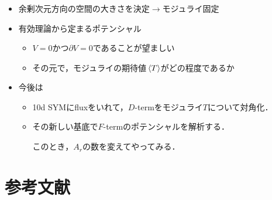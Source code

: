\documentclass[
  a4paper,uplatex,dvipdfmx,10pt,
  xcolor = {dvipsnames,svgnames},
  hyperref ={colorlinks=true,citecolor=Navy,linkcolor=NavyBlue,urlcolor=purple}
]{beamer}
\renewcommand{\theequation}{\thesection.\arabic{equation}}
\begin{document}
\begin{frame}
  \frametitle{\secname}
  \color{DarkMagenta}

  \begin{itemize}
    \color{DarkMagenta}
    \item 
    余剰次元方向の空間の大きさを決定$\rightarrow$モジュライ固定

    \item 
    有効理論から定まるポテンシャル
    \begin{itemize}
      \color{DarkMagenta}
      \item 
      $V=0$かつ$\partial V=0$であることが望ましい
      \item 
      その元で，モジュライの期待値$\ev*{T}$がどの程度であるか
    \end{itemize}

    \color{black}
    \item 
    今後は
    \begin{itemize}
      \item 
      10d SYMにfluxをいれて，$D$-termをモジュライ$T$について対角化．
      \item 
      その新しい基底で$F$-termのポテンシャルを解析する．

      このとき，$A_{r}$の数を変えてやってみる．
    \end{itemize}

  \end{itemize}

\end{frame}


\section{参考文献}
\begin{frame}[allowframebreaks]
  \frametitle{\secname}
  \scriptsize
  \beamertemplatetextbibitems
  
  
  \nocite{Cremades_ComputingYukawa_2004a}
  \nocite{Polonyi_GeneralizationMassive_1977}
  \nocite{Intriligator_DynamicalSUSY_2006a}
  \nocite{Kaku_SuperconformalUnified_1977}
  \nocite{Wess_SupersymmetrySupergravity_1992}
  \nocite{柴崎_背景_2021}
  \nocite{中野_磁化_2023}
\end{frame}


\setcounter{Appendix}{\value{framenumber}}
\setcounter{section}{0}
\renewcommand{\thesubsection}{\Alph{subsection}}
\makeatletter
   \renewcommand{\theequation}{\thesubsection.\arabic{equation}}
   
\end{document}
